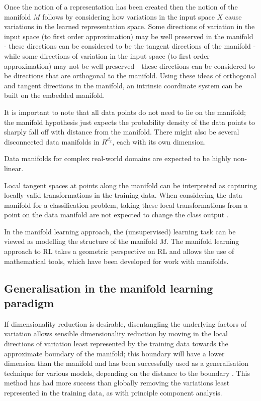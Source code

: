 Once the notion of a representation has been created then the notion of the manifold $M$ follows by considering how variations in the input space $X$ cause variations in the learned representation space.
Some directions of variation in the input space (to first order approximation) may be well preserved in the manifold - these directions can be considered to be the tangent directions of the manifold - while some directions of variation in the input space (to first order approximation) may not be well preserved - these directions can be considered to be directions that are orthogonal to the manifold.
Using these ideas of orthogonal and tangent directions in the manifold, an intrinsic coordinate system can be built on the embedded manifold.

It is important to note that all data points do not need to lie on the manifold; the manifold hypothesis just expects the probability density of the data points to sharply fall off with distance from the manifold.
There might also be several disconnected data manifolds in $R^{d_{x}}$, each with its own dimension.

Data manifolds for complex real-world domains are expected to be highly non-linear.

Local tangent spaces at points along the manifold can be interpreted as capturing locally-valid transformations in the training data.
When considering the data manifold for a classification problem, taking these local transformations from a point on the data manifold are not expected to change the class output \autocite{Bengio2013}.

In the manifold learning approach, the (unsupervised) learning task can be viewed as modelling the structure of the manifold $M$.
The manifold learning approach to RL takes a geometric perspective on RL and allows the use of mathematical tools, which have been developed for work with manifolds.

\subsection{Generalisation in the manifold learning paradigm}

If dimensionality reduction is desirable, disentangling the underlying factors of variation allows sensible dimensionality reduction by moving in the local directions of variation least represented by the training data towards the approximate boundary of the manifold; this boundary will have a lower dimension than the manifold and has been successfully used as a generalisation technique for various models, depending on the distance to the boundary \autocite{Transtrum2015sloppiness}.
This method has had more success than globally removing the variations least represented in the training data, as with principle component analysis.


